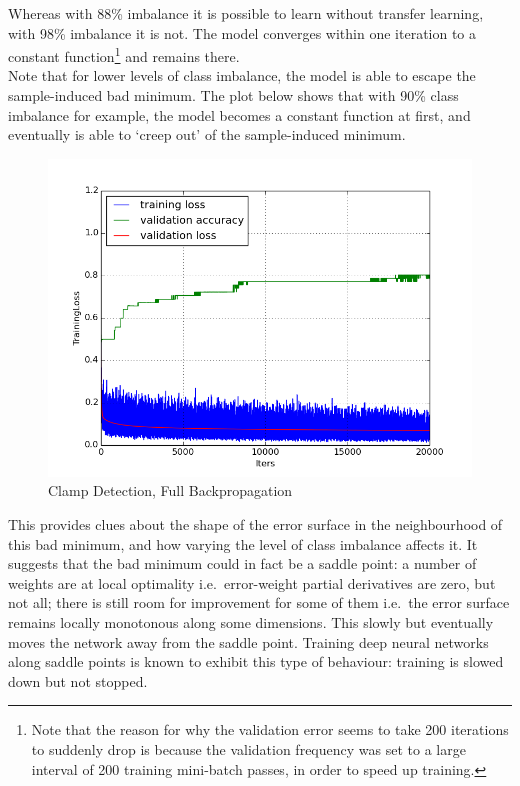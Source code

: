 \documentclass[a4paper,11pt]{article}
\begin{document}
Whereas with 88\% imbalance it is possible to learn without transfer learning, with 98\% imbalance it is not. The model converges within one iteration to a constant function\footnote{Note that the reason for why the validation error seems to take 200 iterations to suddenly drop is because the validation frequency was set to a large interval of 200 training mini-batch passes, in order to speed up training.} and remains there. \\

Note that for lower levels of class imbalance, the model is able to escape the sample-induced bad minimum. The plot below shows that with 90\% class imbalance for example, the model becomes a constant function at first, and eventually is able to `creep out' of the sample-induced minimum. \\

\begin{figure}[h!]
	\centering
	\includegraphics[scale=0.5]{images/plot_clampdetCI_none.png}
	\caption{Clamp Detection, Full Backpropagation}
\end{figure}

This provides clues about the shape of the error surface in the neighbourhood of this bad minimum, and how varying the level of class imbalance affects it. It suggests that the bad minimum could in fact be a saddle point: a number of weights are at local optimality i.e.\ error-weight partial derivatives are zero, but not all; there is still room for improvement for some of them i.e.\ the error surface remains locally monotonous along some dimensions. This slowly but eventually moves the network away from the saddle point. Training deep neural networks along saddle points is known to exhibit this type of behaviour: training is slowed down but not stopped\cite{DL-book}.
\end{document}
